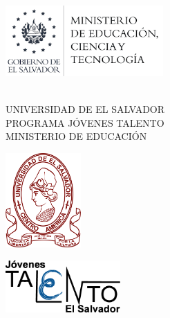 \pagestyle{plain}
\begin{center}
\begin{flushleft}\hspace{55mm}
\includegraphics[height=2.7cm]{../SILABO/LOGO 2020 MINED.png}
\end{flushleft}

\,\\

UNIVERSIDAD DE EL SALVADOR\\
    PROGRAMA JÓVENES TALENTO\\
    MINISTERIO DE EDUCACIÓN
\end{center}

\begin{flushleft}\vspace{-45mm}
\includegraphics[height=3.6cm]{../SILABO/LOGO UES 2020.png}
\end{flushleft}

 
\begin{flushright}\vspace{-40mm}
\includegraphics[height=2cm]{../SILABO/logo.png}
\end{flushright}
\,\\
\,\\

